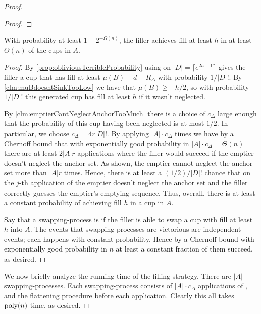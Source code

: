 \begin{proof}
\begin{proof}
\end{proof}

\begin{clm}
With probability at least $1-2^{-\Omega(n)}$, the filler achieves fill
at least $h$ in at least $\Theta(n)$ of the cups in $A$. 
\end{clm}
\begin{proof}
  By \cref{prop:obliviousTerribleProbability} using \randalg on
  $|D| = \lceil e^{2h+1} \rceil$ gives the filler a cup that
  has fill at least $\mu(B) + d-R_\Delta$ with probability
  $1/|D|!$. By \cref{clm:muBdoesntSinkTooLow} we have that
  $\mu(B) \ge -h/2$, so with probability $1/|D|!$ this generated
  cup has fill at least $h$ if it wasn't neglected.

  By \cref{clm:emptierCantNeglectAnchorTooMuch} there is a choice
  of $c_\Delta$ large enough that the probability of this cup
  having been neglected is at most $1/2$. In particular, we
  choose $c_\Delta = 4r|D|!$. By applying \randalg $|A|\cdot
  c_\Delta$ times we have by a Chernoff bound that with
  exponentially good probability in $|A|\cdot c_\Delta =
  \Theta(n)$ there are at least $2|A|r$ applications where the
  filler would succeed if the emptier doesn't neglect the anchor
  set. As shown, the emptier cannot
  neglect the anchor set more than $|A|r$ times. Hence, there
  is at least a $(1/2)/|D|!$ chance that on the $j$-th
  application of \randalg the emptier doesn't neglect the anchor
  set and the filler correctly guesses the emptier's emptying
  sequence. Thus, overall, there is at least a constant
  probability of achieving fill $h$ in a cup in $A$.

  Say that a swapping-process is  if the filler
  is able to swap a cup with fill at least $h$ into $A$. The
  events that swapping-processes are victorious are independent
  events; each happens with constant probability. Hence by a
  Chernoff bound with exponentially good probability in $n$ at
  least a constant fraction of them succeed, as desired.

\end{proof}

We now briefly analyze the running time of the filling strategy.
There are $|A|$ swapping-processes. Each swapping-process
consists of $|A|\cdot c_\Delta$ applications of \randalg, and
the flattening procedure before each application. 
Clearly this all takes $\operatorname{\text{poly}}(n)$ time, as desired.
  
\end{proof}

